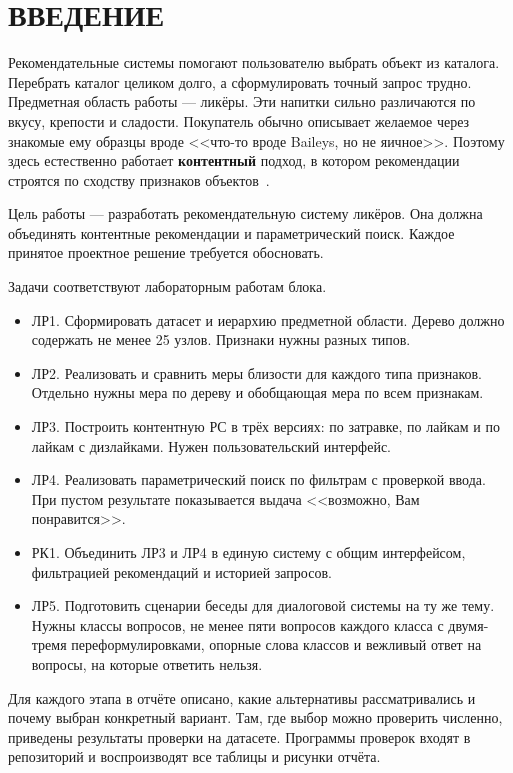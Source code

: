 \chapter*{ВВЕДЕНИЕ}

Рекомендательные системы помогают пользователю выбрать объект из каталога. Перебрать каталог целиком долго, а сформулировать точный запрос трудно. Предметная область работы --- ликёры. Эти напитки сильно различаются по вкусу, крепости и сладости. Покупатель обычно описывает желаемое через знакомые ему образцы вроде <<что-то вроде Baileys, но не яичное>>. Поэтому здесь естественно работает \textbf{контентный} подход, в котором рекомендации строятся по сходству признаков объектов~\cite{lops2011, pazzani2007}.

Цель работы --- разработать рекомендательную систему ликёров. Она должна объединять контентные рекомендации и параметрический поиск. Каждое принятое проектное решение требуется обосновать.

Задачи соответствуют лабораторным работам блока.
\begin{itemize}[leftmargin=1.6\parindent, label*=---]
	\item ЛР1. Сформировать датасет и иерархию предметной области. Дерево должно содержать не менее 25 узлов. Признаки нужны разных типов.
	\item ЛР2. Реализовать и сравнить меры близости для каждого типа признаков. Отдельно нужны мера по дереву и обобщающая мера по всем признакам.
	\item ЛР3. Построить контентную РС в трёх версиях: по затравке, по лайкам и по лайкам с дизлайками. Нужен пользовательский интерфейс.
	\item ЛР4. Реализовать параметрический поиск по фильтрам с проверкой ввода. При пустом результате показывается выдача <<возможно, Вам понравится>>.
	\item РК1. Объединить ЛР3 и ЛР4 в единую систему с общим интерфейсом, фильтрацией рекомендаций и историей запросов.
	\item ЛР5. Подготовить сценарии беседы для диалоговой системы на ту же тему. Нужны классы вопросов, не менее пяти вопросов каждого класса с двумя-тремя переформулировками, опорные слова классов и вежливый ответ на вопросы, на которые ответить нельзя.
\end{itemize}

Для каждого этапа в отчёте описано, какие альтернативы рассматривались и почему выбран конкретный вариант. Там, где выбор можно проверить численно, приведены результаты проверки на датасете. Программы проверок входят в репозиторий и воспроизводят все таблицы и рисунки отчёта.
